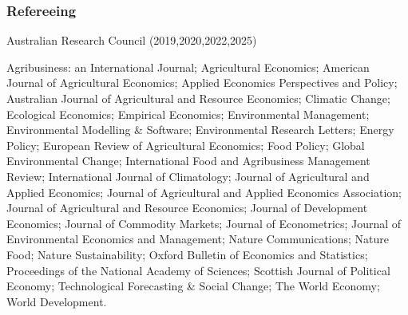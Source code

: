 \documentclass[10pt]{article}
\begin{document}
	\bigskip
	\subsubsection*{Refereeing}
	Australian Research Council (2019,2020,2022,2025)
	
	\medskip
	Agribusiness: an International Journal; Agricultural Economics; American Journal of Agricultural Economics; Applied Economics Perspectives and Policy; Australian Journal of Agricultural and Resource Economics; Climatic Change; Ecological Economics; Empirical Economics; Environmental Management; Environmental Modelling \& Software; Environmental Research Letters; Energy Policy; European Review of Agricultural Economics; Food Policy; Global Environmental Change; International Food and Agribusiness Management Review; International Journal of Climatology; Journal of Agricultural and Applied Economics; Journal of Agricultural and Applied Economics Association; Journal of Agricultural and Resource Economics; Journal of Development Economics; Journal of Commodity Markets; Journal of Econometrics; Journal of Environmental Economics and Management; Nature Communications; Nature Food; Nature Sustainability; Oxford Bulletin of Economics and Statistics; Proceedings of the National Academy of Sciences; Scottish Journal of Political Economy; Technological Forecasting \& Social Change; The World Economy; World Development.
	
	\bigskip
\end{document}
